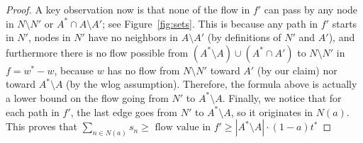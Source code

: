 \begin{proof}
A key observation now is that none of the flow in $f'$ can pass by any node in $N\setminus N'$ or $A^*\cap A\setminus A'$; see Figure~\ref{fig:sets}. 
This is because any path in $f'$ starts in $N'$, nodes in $N'$ have no neighbors in $A\setminus A'$ (by definitions of $N'$ and $A'$), and furthermore there is no flow possible from $(A^*\setminus A)\cup (A^*\cap A')$ to $N\setminus N'$ in $f=w^*-w$, because $w$ has no flow from $N\setminus N'$ toward $A'$ (by our claim) nor toward $A^*\setminus A$ (by the wlog assumption).
Therefore, the formula above is actually a lower bound on the flow going from $N'$ to $A^*\setminus A$. Finally, we notice that for each path in $f'$, the last edge goes from $N'$ to $A^*\setminus A$, so it originates in $N(a)$. This proves that $\sum_{n\in N(a)} s_n\geq \text{ flow value in } f'\geq |A^* \setminus A|\cdot (1-a) t^*$%
\end{proof}

